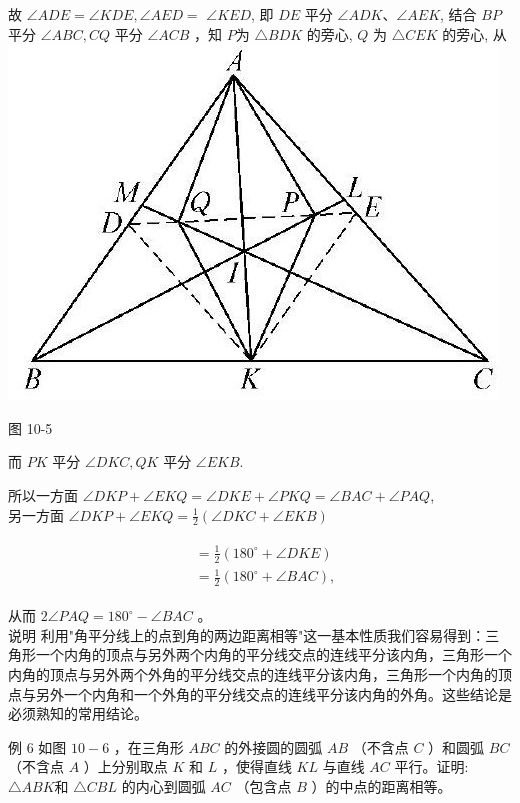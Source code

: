 \documentclass[10pt]{article}
\begin{document}
故 $\angle A D E=\angle K D E, \angle A E D=$ $\angle K E D$, 即 $D E$ 平分 $\angle A D K 、 \angle A E K$, 结合 $B P$ 平分 $\angle A B C, C Q$ 平分 $\angle A C B$ ，知 $P$为 $\triangle B D K$ 的旁心, $Q$ 为 $\triangle C E K$ 的旁心, 从\\
\includegraphics[max width=\textwidth, center]{2024_10_30_66b8e5e701da2093c133g-074}

图 10-5

而 $P K$ 平分 $\angle D K C, Q K$ 平分 $\angle E K B$.

所以一方面 $\angle D K P+\angle E K Q=\angle D K E+\angle P K Q=\angle B A C+\angle P A Q$,\\
另一方面 $\angle D K P+\angle E K Q=\frac{1}{2}(\angle D K C+\angle E K B)$

\begin{align*}
\begin{aligned}
& =\frac{1}{2}\left(180^{\circ}+\angle D K E\right) \\
& =\frac{1}{2}\left(180^{\circ}+\angle B A C\right),
\end{aligned}
\end{align*}

从而 $2 \angle P A Q=180^{\circ}-\angle B A C$ 。\\
说明 利用"角平分线上的点到角的两边距离相等"这一基本性质我们容易得到：三角形一个内角的顶点与另外两个内角的平分线交点的连线平分该内角，三角形一个内角的顶点与另外两个外角的平分线交点的连线平分该内角，三角形一个内角的顶点与另外一个内角和一个外角的平分线交点的连线平分该内角的外角。这些结论是必须熟知的常用结论。

例 6 如图 $10-6$ ，在三角形 $A B C$ 的外接圆的圆弧 $A B$ （不含点 $C$ ）和圆弧 $B C$ （不含点 $A$ ）上分别取点 $K$ 和 $L$ ，使得直线 $K L$ 与直线 $A C$ 平行。证明: $\triangle A B K$和 $\triangle C B L$ 的内心到圆弧 $A C$ （包含点 $B$ ）的中点的距离相等。
\end{document}
